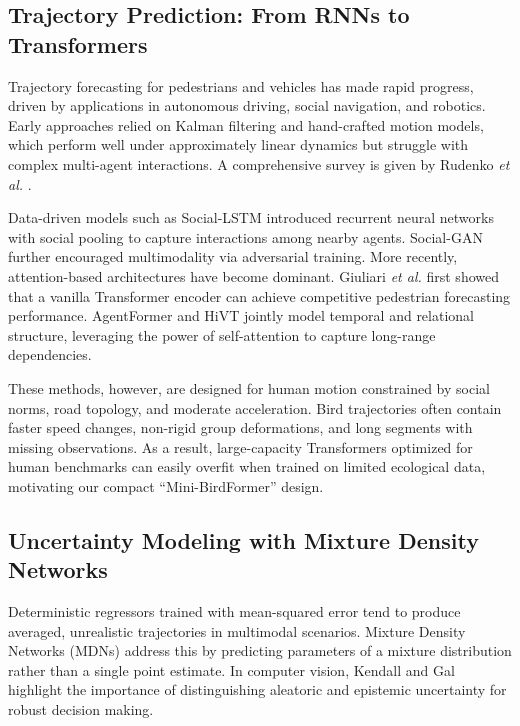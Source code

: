 \documentclass[journal]{IEEEtran}
\begin{document}
\subsection{Trajectory Prediction: From RNNs to Transformers}

Trajectory forecasting for pedestrians and vehicles has made rapid progress, driven by applications in autonomous driving, social navigation, and robotics. Early approaches relied on Kalman filtering and hand-crafted motion models, which perform well under approximately linear dynamics but struggle with complex multi-agent interactions. A comprehensive survey is given by Rudenko \textit{et al.} \cite{Rudenko2020Survey}.

Data-driven models such as Social-LSTM \cite{Alahi2016SocialLSTM} introduced recurrent neural networks with social pooling to capture interactions among nearby agents. Social-GAN \cite{Gupta2018SocialGAN} further encouraged multimodality via adversarial training. More recently, attention-based architectures have become dominant. Giuliari \textit{et al.} \cite{Giuliari2021Transformer} first showed that a vanilla Transformer encoder can achieve competitive pedestrian forecasting performance. AgentFormer \cite{Yuan2021AgentFormer} and HiVT \cite{Liu2022HiVT} jointly model temporal and relational structure, leveraging the power of self-attention \cite{Vaswani2017Attention} to capture long-range dependencies.

These methods, however, are designed for human motion constrained by social norms, road topology, and moderate acceleration. Bird trajectories often contain faster speed changes, non-rigid group deformations, and long segments with missing observations. As a result, large-capacity Transformers optimized for human benchmarks can easily overfit when trained on limited ecological data, motivating our compact ``Mini-BirdFormer'' design.

\subsection{Uncertainty Modeling with Mixture Density Networks}

Deterministic regressors trained with mean-squared error tend to produce averaged, unrealistic trajectories in multimodal scenarios. Mixture Density Networks (MDNs) \cite{Bishop1994MDN} address this by predicting parameters of a mixture distribution rather than a single point estimate. In computer vision, Kendall and Gal \cite{Kendall2017Uncertainty} highlight the importance of distinguishing aleatoric and epistemic uncertainty for robust decision making.
\end{document}
